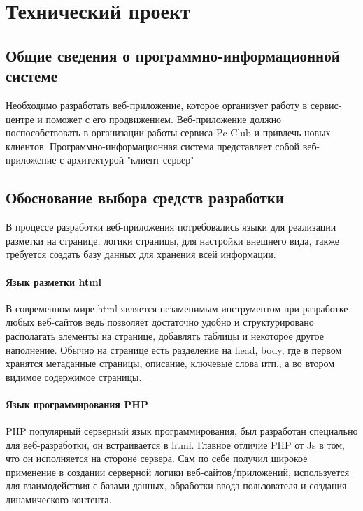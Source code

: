 \section{Технический проект}
\subsection{Общие сведения о программно-информационной системе}

Необходимо разработать веб-приложение, которое организует работу в сервис-центре и поможет с его продвижением. Веб-приложение должно поспособствовать в организации работы сервиса Pc-Club и привлечь новых клиентов. Программно-информационная система представляет собой веб-приложение с архитектурой "клиент-сервер"

\subsection{Обоснование выбора средств разработки}

В процессе разработки веб-приложения потребовались языки для реализации разметки на странице, логики страницы, для настройки внешнего вида, также требуется создать базу данных для хранения всей информации. 

\paragraph{Язык разметки html}

В современном мире html является незаменимым инструментом при разработке любых веб-сайтов ведь позволяет достаточно удобно и структурировано располагать элементы на странице, добавлять таблицы и некоторое другое наполнение. Обычно на странице есть разделение на head, body, где в первом хранятся метаданные страницы, описание, ключевые слова итп., а во втором видимое содержимое страницы.

\paragraph{Язык программирования PHP}

PHP популярный серверный язык программирования, был разработан специально для веб-разработки, он встраивается в html. Главное отличие PHP от Js в том, что он исполняется на стороне сервера. Сам по себе получил широкое применение в создании серверной логики веб-сайтов/приложений, используется для взаимодействия с базами данных, обработки ввода пользователя и создания динамического контента.

